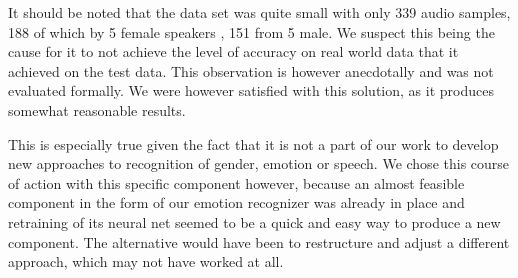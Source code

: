 It should be noted that the data set was quite small with only 339 audio samples, 188 of which by 5 female speakers , 151 from 5 male.
We suspect this being the cause for it to not achieve the level of accuracy on real world data that it achieved on the test data.
This observation is however anecdotally and was not evaluated formally.
We were however satisfied with this solution, as it produces somewhat reasonable results.

This is especially true given the fact that it is not a part of our work to develop new approaches to recognition of gender, emotion or speech.
We chose this course of action with this specific component however, because an almost feasible component in the form of our emotion recognizer was already in place and retraining of its neural net seemed to be a quick and easy way to produce a new component.
The alternative would have been to restructure and adjust a different approach, which may not have worked at all.







